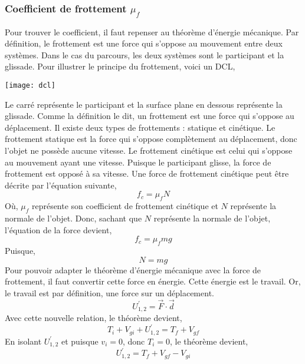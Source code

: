 \documentclass[12pt]{article}
\begin{document}
\subsubsection{Coefficient de frottement $\mu_{f}$}
Pour trouver le coefficient, il faut repenser au théorème d'énergie mécanique. Par définition, le frottement est une force qui s'oppose au mouvement entre deux systèmes. Dans le cas du parcours, les deux systèmes sont le participant et la glissade. Pour illustrer le principe du frottement, voici un DCL,
\begin{center}
	\texttt{[image: dcl]}
\end{center}
Le carré représente le participant et la surface plane en dessous représente la glissade. Comme la définition le dit, un frottement est une force qui s'oppose au déplacement. Il existe deux types de frottements : statique et cinétique. Le frottement statique est la force qui s'oppose complètement au déplacement, donc l'objet ne possède aucune vitesse. Le frottement cinétique est celui qui s'oppose au mouvement ayant une vitesse. Puisque le participant glisse, la force de frottement est opposé à sa vitesse.
\newline
\newline
Une force de frottement cinétique peut être décrite par l'équation suivante,
\begin{equation}
f_c = \mu_fN
\end{equation}
Où, $\mu_f$ représente son coefficient de frottement cinétique et $N$ représente la normale de l'objet. Donc, sachant que $N$ représente la normale de l'objet, l'équation de la force devient,
\begin{equation}
f_c = \mu_fmg
\end{equation}
Puisque,
\begin{equation}
N = mg
\end{equation}
Pour pouvoir adapter le théorème d'énergie mécanique avec la force de frottement, il faut convertir cette force en énergie. Cette énergie est le travail. Or, le travail est par définition, une force sur un déplacement.
\begin{equation}
U_{1,2}^{'} = \vec{F} \cdot \vec{d}
\end{equation}
Avec cette nouvelle relation, le théorème devient,
\begin{equation}
T_i + V_{gi} + U_{1,2}^{'} = T_f + V_{gf}
\end{equation}
En isolant $U_{1,2}^{'}$ et puisque $v_i = 0$, donc $T_i = 0$, le théorème devient,
\begin{equation}
U_{1,2}^{'} = T_f + V_{gf} - V_{gi}
\end{equation}
\end{document}
